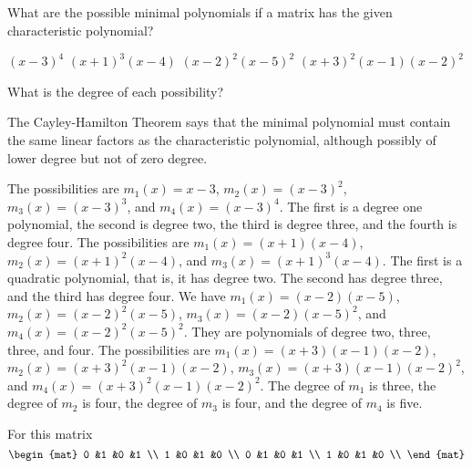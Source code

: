 \begin{exercises}
  \recommended \item 
    What are the possible minimal polynomials if a matrix has
    the given characteristic polynomial?
    \begin{exparts*}
      \partsitem $(x-3)^4$
      \partsitem $(x+1)^3(x-4)$
      \partsitem $(x-2)^2(x-5)^2$
      \partsitem  \( (x+3)^2(x-1)(x-2)^2 \)
    \end{exparts*}
    What is the degree of each possibility?
    \begin{answer} 
      The Cayley-Hamilton Theorem   says that
      the minimal polynomial must contain the same linear factors
      as the characteristic polynomial, although possibly of lower degree
      but not of zero degree.
      \begin{exparts}
        \partsitem The possibilities are 
          $m_1(x)=x-3$, $m_2(x)=(x-3)^2$, $m_3(x)=(x-3)^3$,
          and $m_4(x)=(x-3)^4$.
          The first is a degree one polynomial, the second is degree two,
          the third is degree three, and the fourth is degree four.
        \partsitem The possibilities are $m_1(x)=(x+1)(x-4)$,
          $m_2(x)=(x+1)^2(x-4)$, and $m_3(x)=(x+1)^3(x-4)$.
          The first is a quadratic polynomial, that is, it has degree two.
          The second has degree three, and the third has degree four.
        \partsitem We have $m_1(x)=(x-2)(x-5)$, $m_2(x)=(x-2)^2(x-5)$,
          $m_3(x)=(x-2)(x-5)^2$, and $m_4(x)=(x-2)^2(x-5)^2$.
          They are polynomials of degree two, three, three, and four.
        \partsitem The possibilities are \( m_1(x)=(x+3)(x-1)(x-2) \),
          \( m_2(x)=(x+3)^2(x-1)(x-2) \),
          \( m_3(x)=(x+3)(x-1)(x-2)^2 \),
          and \( m_4(x)=(x+3)^2(x-1)(x-2)^2 \).
          The degree of $m_1$ is three, the degree of $m_2$ is four,
          the degree of $m_3$ is four, and the degree of $m_4$ is five.
      \end{exparts}
    \end{answer}
  \item For this matrix
    \begin{equation*}
      \begin{mat}
        0 &1 &0 &1 \\
        1 &0 &1 &0 \\
        0 &1 &0 &1 \\
        1 &0 &1 &0 \\
      \end{mat}

\end{equation*}
\end{exercises}
